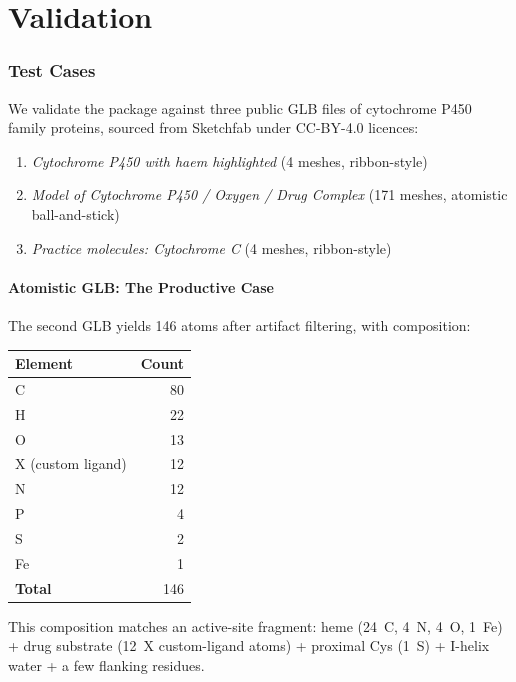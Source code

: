 \documentclass[11pt,twocolumn,a4paper]{article}
\theoremstyle{definition}
\theoremstyle{remark}
\begin{document}
\part{Validation}

\section{Test Cases}
\label{sec:test_cases}

We validate the package against three public GLB files of cytochrome
P450 family proteins, sourced from Sketchfab under CC-BY-4.0 licences:

\begin{enumerate}[nosep, leftmargin=*]
\item \emph{Cytochrome P450 with haem highlighted} (4 meshes,
  ribbon-style)
\item \emph{Model of Cytochrome P450 / Oxygen / Drug Complex} (171
  meshes, atomistic ball-and-stick)
\item \emph{Practice molecules: Cytochrome C} (4 meshes, ribbon-style)
\end{enumerate}

\subsection{Atomistic GLB: The Productive Case}

The second GLB yields 146 atoms after artifact filtering, with
composition:

\begin{center}
\small
\begin{tabular}{lr}
\toprule
\textbf{Element} & \textbf{Count} \\
\midrule
C  & 80 \\
H  & 22 \\
O  & 13 \\
X (custom ligand) & 12 \\
N  & 12 \\
P  & 4 \\
S  & 2 \\
Fe & 1 \\
\midrule
\textbf{Total} & 146 \\
\bottomrule
\end{tabular}
\end{center}

This composition matches an active-site fragment: heme (24~C, 4~N, 4~O,
1~Fe) + drug substrate (12~X custom-ligand atoms) + proximal Cys
(1~S) + I-helix water + a few flanking residues.
\end{document}
